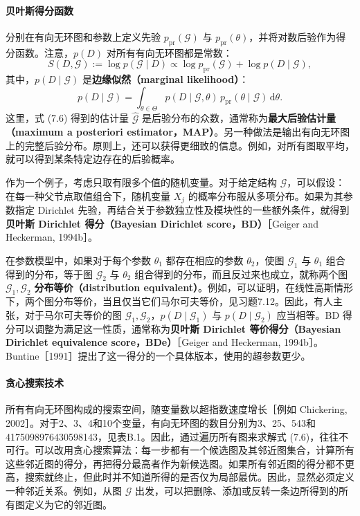 \paragraph{贝叶斯得分函数}
分别在有向无环图和参数上定义先验 $p_{\mathrm{pr}}(\mathcal G)$ 与 $p_{\mathrm{pr}}(\theta)$，并将对数后验作为得分函数。注意，$p(D)$ 对所有有向无环图都是常数：
\[
 S(D,\mathcal G):=\log p(\mathcal G\mid D)
 \propto\log p_{\mathrm{pr}}(\mathcal G)+\log p(D\mid\mathcal G),
\]
其中，$p(D\mid\mathcal G)$ 是\textbf{边缘似然（marginal likelihood）}：
\[
 p(D\mid\mathcal G)=
 \int_{\theta\in\Theta}
 p(D\mid\mathcal G,\theta)\,
 p_{\mathrm{pr}}(\theta\mid\mathcal G)\,\mathrm{d}\theta.
\]
这里，式 (7.6) 得到的估计量 $\widehat{\mathcal G}$ 是后验分布的众数，通常称为\textbf{最大后验估计量（maximum a posteriori estimator，MAP）}。另一种做法是输出有向无环图上的完整后验分布。原则上，还可以获得更细致的信息。例如，对所有图取平均，就可以得到某条特定边存在的后验概率。

作为一个例子，考虑只取有限多个值的随机变量。对于给定结构 $\mathcal G$，可以假设：在每一种父节点取值组合下，随机变量 $X_j$ 的概率分布服从多项分布。如果为其参数指定 Dirichlet 先验，再结合关于参数独立性及模块性的一些额外条件，就得到\textbf{贝叶斯 Dirichlet 得分（Bayesian Dirichlet score，BD）}［Geiger and Heckerman, 1994b］。

在参数模型中，如果对于每个参数 $\theta_1$ 都存在相应的参数 $\theta_2$，使图 $\mathcal G_1$ 与 $\theta_1$ 组合得到的分布，等于图 $\mathcal G_2$ 与 $\theta_2$ 组合得到的分布，而且反过来也成立，就称两个图 $\mathcal G_1,\mathcal G_2$ \textbf{分布等价（distribution equivalent）}。例如，可以证明，在线性高斯情形下，两个图分布等价，当且仅当它们马尔可夫等价，见习题7.12。因此，有人主张，对于马尔可夫等价的图 $\mathcal G_1,\mathcal G_2$，$p(D\mid\mathcal G_1)$ 与 $p(D\mid\mathcal G_2)$ 应当相等。BD 得分可以调整为满足这一性质，通常称为\textbf{贝叶斯 Dirichlet 等价得分（Bayesian Dirichlet equivalence score，BDe）}［Geiger and Heckerman, 1994b］。Buntine［1991］提出了这一得分的一个具体版本，使用的超参数更少。

\paragraph{贪心搜索技术}
所有有向无环图构成的搜索空间，随变量数以超指数速度增长［例如 Chickering, 2002］。对于2、3、4和10个变量，有向无环图的数目分别为3、25、543和4175098976430598143，见表B.1。因此，通过遍历所有图来求解式 (7.6)，往往不可行。可以改用贪心搜索算法：每一步都有一个候选图及其邻近图集合，计算所有这些邻近图的得分，再把得分最高者作为新候选图。如果所有邻近图的得分都不更高，搜索就终止，但此时并不知道所得的是否仅为局部最优。因此，显然必须定义一种邻近关系。例如，从图 $\mathcal G$ 出发，可以把删除、添加或反转一条边所得到的所有图定义为它的邻近图。

